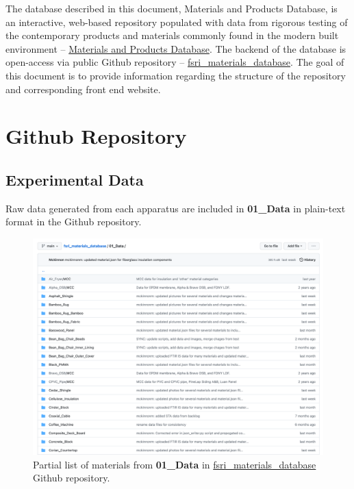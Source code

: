 \documentclass[12pt,oneside]{book}
\begin{document}
The database described in this document, Materials and Products Database, is an interactive, web-based repository populated with data from rigorous testing of the contemporary products and materials commonly found in the modern built environment -- \href{https://materials.fsri.org}{Materials and Products Database}. The backend of the database is open-access via public Github repository -- \href{https://github.com/ulfsri/fsri_materials_database}{fsri\_materials\_database}. The goal of this document is to provide information regarding the structure of the repository and corresponding front end website.

\chapter{Github Repository}
\label{sec:data}

\section{Experimental Data}

Raw data generated from each apparatus are included in {\bf 01\_Data} in plain-text format in the Github repository. 

\begin{figure}[!ht]
\centering
\includegraphics[width=.95\columnwidth]{Figures/partial_materials_github}
\caption[Partial List of Materials from Github Repository]{Partial list of materials from {\bf 01\_Data} in \href{https://github.com/ulfsri/fsri_materials_database}{fsri\_materials\_database} Github repository.}
\label{fig:mat_list}
\end{figure}
\end{document}
